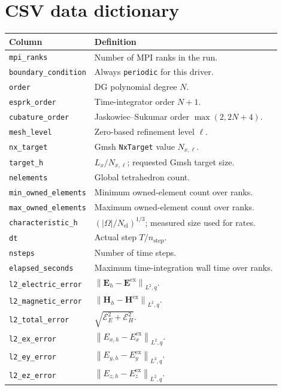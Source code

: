 \documentclass[11pt]{article}
\newcommand{\vect}[1]{\boldsymbol{#1}}
\newcommand{\norm}[1]{\left\lVert #1 \right\rVert}
\newcommand{\abs}[1]{\left| #1 \right|}
\newcommand{\code}[1]{\nolinkurl{#1}}
\newcommand{\Eex}{\vect E^{\mathrm{ex}}}
\newcommand{\Hex}{\vect H^{\mathrm{ex}}}
\newcommand{\Eh}{\vect E_h}
\newcommand{\Hh}{\vect H_h}
\begin{document}
\section{CSV data dictionary}

\small
\begin{longtable}{>{\raggedright\arraybackslash}p{}
                  >{\raggedright\arraybackslash}p{}}
\toprule
Column & Definition \\
\midrule
\endhead
\code{mpi_ranks} & Number of MPI ranks in the run. \\
\code{boundary_condition} & Always \code{periodic} for this driver. \\
\code{order} & DG polynomial degree \(N\). \\
\code{esprk_order} & Time-integrator order \(N+1\). \\
\code{cubature_order} & Jaskowiec--Sukumar order \(\max(2,2N+4)\). \\
\code{mesh_level} & Zero-based refinement level \(\ell\). \\
\code{nx_target} & Gmsh \code{NxTarget} value \(N_{x,\ell}\). \\
\code{target_h} & \(L_x/N_{x,\ell}\); requested Gmsh target size. \\
\code{nelements} & Global tetrahedron count. \\
\code{min_owned_elements} & Minimum owned-element count over ranks. \\
\code{max_owned_elements} & Maximum owned-element count over ranks. \\
\code{characteristic_h} &
\((\abs{\Omega}/N_{\mathrm{el}})^{1/3}\); measured size used for rates.
\\
\code{dt} & Actual step \(T/n_{\mathrm{step}}\). \\
\code{nsteps} & Number of time steps. \\
\code{elapsed_seconds} & Maximum time-integration wall time over ranks. \\
\code{l2_electric_error} & \(\norm{\Eh-\Eex}_{L^2,q}\). \\
\code{l2_magnetic_error} & \(\norm{\Hh-\Hex}_{L^2,q}\). \\
\code{l2_total_error} &
\(\sqrt{\mathcal{E}_E^2+\mathcal{E}_H^2}\).
\\
\code{l2_ex_error} & \(\norm{E_{x,h}-E_x^{\mathrm{ex}}}_{L^2,q}\). \\
\code{l2_ey_error} & \(\norm{E_{y,h}-E_y^{\mathrm{ex}}}_{L^2,q}\). \\
\code{l2_ez_error} & \(\norm{E_{z,h}-E_z^{\mathrm{ex}}}_{L^2,q}\). \\

\end{longtable}
\end{document}
